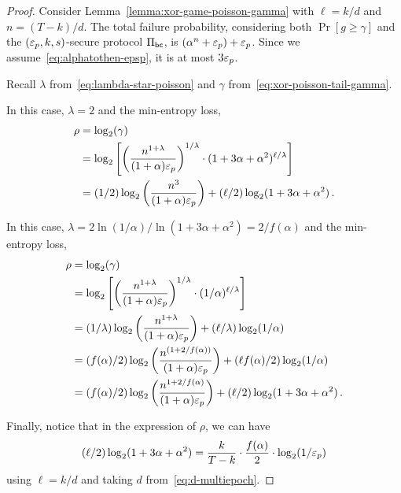 \begin{proof}  
  Consider Lemma~\ref{lemma:xor-game-poisson-gamma} 
  with $\ell = k/d$ and $n = (T-k)/d$. 
  The total failure probability, 
  considering both $\Pr[g \geq \gamma]$ and 
  the $(\mathsf{\varepsilon}_p, k, s)$-secure protocol $\Pi_\mathsf{bc}$, 
  is $(\alpha^n + \mathsf{\varepsilon}_p) + \mathsf{\varepsilon}_p$. 
  Since we assume~\eqref{eq:alphatothen-epsp}, it is at most $3 \mathsf{\varepsilon}_p$.

  Recall $\lambda$ from~\eqref{eq:lambda-star-poisson} and $\gamma$ from~\eqref{eq:xor-poisson-tail-gamma}.

  In this case, $\lambda = 2$ and 
  the min-entropy loss, 
  \begin{align*}
    \rho &= \log_2(\gamma) \\
        &= \log_2 \left[  \left(\frac{n^{1 + \lambda} }{ (1+\alpha) \mathsf{\varepsilon}_p} \right)^{1/\lambda}
          \cdot (1 + 3 \alpha + \alpha^2)^{\ell/\lambda}
        \right] \\
        &= (1/2)\log_2 \left(\frac{n^3}{ (1+\alpha) \mathsf{\varepsilon}_p} \right) 
          + (\ell/2) \log_2(1 + 3 \alpha + \alpha^2)
        \,.
  \end{align*}
  
  In this case, $\lambda = 2 \ln(1/\alpha)/\ln(1+3\alpha+\alpha^2) = 2/f(\alpha)$ and 
  the min-entropy loss, 
  \begin{align*}
    \rho &= \log_2(\gamma) \\
        &= \log_2 \left[  \left(\frac{n^{1 + \lambda} }{ (1+\alpha) \mathsf{\varepsilon}_p} \right)^{1/\lambda}
          \cdot (1/\alpha)^{\ell/\lambda}
        \right] \\
        &= (1/\lambda) \log_2 \left(\frac{n^{1 + \lambda} }{ (1+\alpha) \mathsf{\varepsilon}_p} \right)
          + (\ell/\lambda) \log_2(1/\alpha)
        \\
        &= (f(\alpha)/2)\log_2 \left(\frac{n^{(1 + 2/f(\alpha))} }{ (1+\alpha) \mathsf{\varepsilon}_p} \right) 
          + (\ell f(\alpha)/2) \log_2(1/\alpha)
          \\
        &= (f(\alpha)/2)\log_2 \left(\frac{n^{1 + 2/f(\alpha)} }{ (1+\alpha) \mathsf{\varepsilon}_p} \right) 
          + (\ell/2) \log_2(1 + 3\alpha + \alpha^2)
        \,.
  \end{align*}

  Finally, notice that in the expression of $\rho$, we can have
  $$
  (\ell/2) \log_2(1+3\alpha + \alpha^2) = \frac{k}{T-k} \cdot \frac{f(\alpha)}{2}\cdot \log_2(1/\mathsf{\varepsilon}_p)
  $$
  using $\ell = k/d$ and taking $d$ from~\eqref{eq:d-multiepoch}.
\end{proof}

